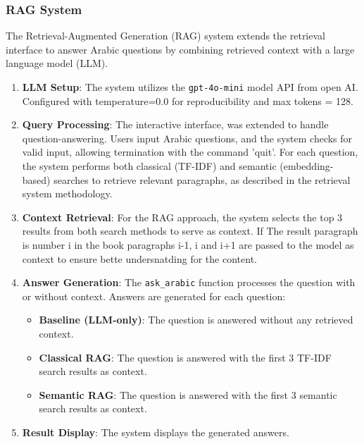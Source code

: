 \documentclass[12pt]{article}
\begin{document}
\subsubsection{RAG System}

The Retrieval-Augmented Generation (RAG) system extends the retrieval interface to answer Arabic questions by combining retrieved context with a large language model (LLM).


\begin{enumerate}
    \item \textbf{LLM Setup}: The system utilizes the \texttt{gpt-4o-mini} model API from open AI. Configured with temperature=0.0 for reproducibility and max tokens = 128.
    
    \item \textbf{Query Processing}: The interactive interface, was extended to handle question-answering. Users input Arabic questions, and the system checks for valid input, allowing termination with the command 'quit'. For each question, the system performs both classical (TF-IDF) and semantic (embedding-based) searches to retrieve relevant paragraphs, as described in the retrieval system methodology.
    
    \item \textbf{Context Retrieval}: For the RAG approach, the system selects the top 3 results from both search methods to serve as context. If The result paragraph is number i in the book paragraphs i-1, i and i+1 are passed to the model as context to ensure bette undersnatding for the content.
    
    \item \textbf{Answer Generation}: The \texttt{ask\_arabic} function processes the question with or without context. Answers are generated for each question:
    \begin{itemize}
        \item \textbf{Baseline (LLM-only)}: The question is answered without any retrieved context.
        \item \textbf{Classical RAG}: The question is answered with the first 3 TF-IDF search results as context.
        \item \textbf{Semantic RAG}: The question is answered with the first 3 semantic search results as context.
    \end{itemize}
    
    \item \textbf{Result Display}: The system displays the generated answers.
\end{enumerate}
\end{document}
